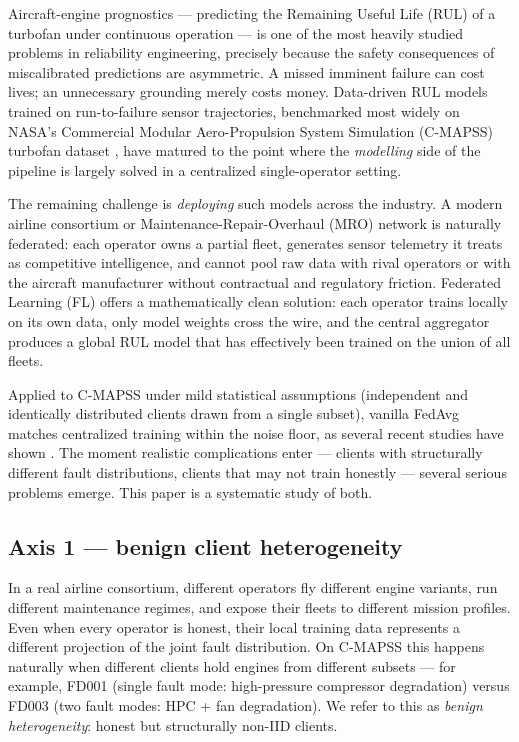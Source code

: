 \documentclass[preprint,12pt,authoryear]{elsarticle}
\begin{document}
Aircraft-engine prognostics --- predicting the Remaining Useful Life
(RUL) of a turbofan under continuous operation --- is one of the most
heavily studied problems in reliability engineering, precisely
because the safety consequences of miscalibrated predictions are
asymmetric. A missed imminent failure can cost lives; an unnecessary
grounding merely costs money. Data-driven RUL models trained on
run-to-failure sensor trajectories, benchmarked most widely on
NASA's Commercial Modular Aero-Propulsion System Simulation
(C-MAPSS) turbofan dataset \citep{Saxena2008CMAPSS}, have matured to
the point where the \emph{modelling} side of the pipeline is largely
solved in a centralized single-operator setting.

The remaining challenge is \emph{deploying} such models across the
industry. A modern airline consortium or
Maintenance-Repair-Overhaul (MRO) network is naturally federated:
each operator owns a partial fleet, generates sensor telemetry it
treats as competitive intelligence, and cannot pool raw data with
rival operators or with the aircraft manufacturer without
contractual and regulatory friction. Federated Learning (FL)
\citep{McMahan2017FedAvg} offers a mathematically clean solution:
each operator trains locally on its own data, only model weights
cross the wire, and the central aggregator produces a global RUL
model that has effectively been trained on the union of all fleets.

Applied to C-MAPSS under mild statistical assumptions (independent
and identically distributed clients drawn from a single subset),
vanilla FedAvg matches centralized training within the noise floor,
as several recent studies have shown
\citep{Barbosa2025FLJetEngines,Vermelin2024CollabFLRUL,%
Pandhare2021FederatedBaseline}. The moment realistic complications
enter --- clients with structurally different fault distributions,
clients that may not train honestly --- several serious problems
emerge. This paper is a systematic study of both.

\subsection{Axis 1 --- benign client heterogeneity}
\label{subsec:axis1-intro}

In a real airline consortium, different operators fly different
engine variants, run different maintenance regimes, and expose their
fleets to different mission profiles. Even when every operator is
honest, their local training data represents a different projection
of the joint fault distribution. On C-MAPSS this happens naturally
when different clients hold engines from different subsets --- for
example, FD001 (single fault mode: high-pressure compressor
degradation) versus FD003 (two fault modes: HPC + fan degradation).
We refer to this as \emph{benign heterogeneity}: honest but
structurally non-IID clients.
\end{document}
